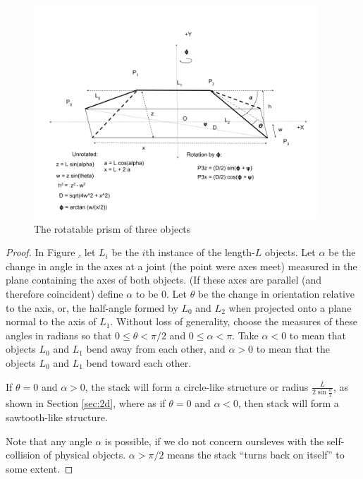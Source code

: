 \documentclass[11pt]{article}
\begin{document}
{\begin{figure}
     \centering
     \includegraphics[width=0.95\textwidth]{figures/StackedSetup.png}
     \caption{The rotatable prism of three objects}
  \label{fig:prismdiagram}
\end{figure}

\begin{proof}

  In Figure \href{fig:prismdiagram}, let $L_i$ be the $i$th instance of the length-$L$ objects. Let $\alpha$ be the
  change in angle in the axes at a joint (the point were axes meet) measured in the plane containing the axes of both objects. (If these axes are parallel (and therefore coincident) define $\alpha$ to be 0.
  Let $\theta$ be the change in orientation relative to the axis,
  or, the half-angle formed by $L_0$ and $L_2$ when projected onto a plane normal to the axis of $L_1$.
  Without loss of generality, choose the measures of these angles in radians so that
  $0 \leq \theta < \pi/2$ and $0 \leq \alpha < \pi$.
  Take $\alpha < 0$ to mean that objects $L_0$ and $L_1$ bend away from each other,
  and $\alpha > 0$ to mean that the objects $L_0$ and $L_1$ bend toward each other.

  If $\theta = 0$ and $\alpha > 0$, the stack will form a circle-like structure or radius 
  $\frac{L}{2 \sin{\frac{\alpha}{2}}}$, as shown in Section \ref{sec:2d}, where as if
  $\theta = 0$ and $\alpha < 0$, then stack will form a sawtooth-like structure.

  Note that any angle $\alpha$ is possible, if we do not concern oursleves with the self-collision
  of physical objects. $\alpha > \pi/2$ means the stack ``turns back on itself'' to some extent.


\end{proof}}
\end{document}
